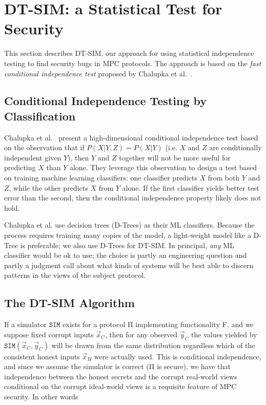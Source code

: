 \documentclass[compsoc, conference, a4paper, 10pt, times]{IEEEtran}
\newcommand{\toolname}{\textsc{DT-SIM}\xspace}
\begin{document}
\section{\toolname: a Statistical Test for Security}

This section describes \toolname, our approach for using statistical independence testing to find security bugs in MPC protocols. The approach is based on the \emph{fast conditional independence test} proposed by Chalupka et al.~\cite{chalupka2018fast}.

\subsection{Conditional Independence Testing by Classification}

Chalupka et al.~\cite{chalupka2018fast} present a high-dimensional conditional independence test based on the observation that if $P(X | Y, Z) = P(X | Y)$ (i.e. $X$ and $Z$ are conditionally independent given $Y$), then $Y$ and $Z$ together will not be more useful for predicting $X$ than $Y$ alone. They leverage this observation to design a test based on training machine learning classifiers: one classifier predicts $X$ from both $Y$ and $Z$, while the other predicts $X$ from $Y$ alone. If the first classifier yields better test error than the second, then the conditional independence property likely does not hold.

Chalupka et al. use decision trees (D-Trees) as their ML classifiers.
Because the process requires training many copies of the model, a light-weight model like a D-Tree is preferable;
we also use D-Trees for \toolname.
In principal, \textit{any} ML classifier would be ok to use; the choice is partly an engineering question
and partly a judgment call about what kinds of systems will be best able to discern patterns in the views of the subject protocol.

\subsection{The \toolname Algorithm}\label{sec:algorithm}

If a simulator $\mathtt{SIM}$ exists for a protocol Π implementing functionality F,
and we suppose fixed corrupt inputs $\vec{x}_C$,
then for any observed $\vec{y}_C$ the values yielded by $\mathtt{SIM}(\vec{x}_C, \vec{y}_C)$
will be drawn from the same distribution regardless which of the consistent honest inputs $\vec{x}_H$ were actually used.
This is conditional independence, and since we assume the simulator is correct (Π is secure),
we have that independence between the honest secrets and the corrupt real-world views conditional on the corrupt ideal-world views
is a requisite feature of MPC security.
In other words
\end{document}
